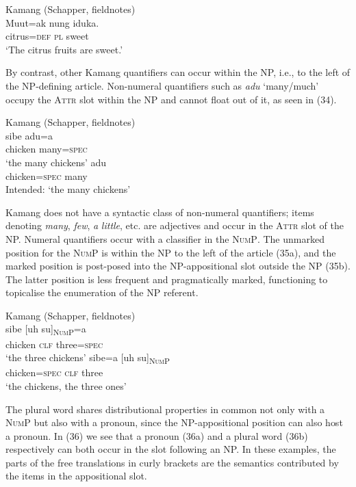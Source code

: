 \ea%
\label{ex:33}
Kamang (Schapper, fieldnotes)\\
\gll  Muut=ak nung iduka. \\
  citrus=\textsc{def} \textsc{pl} sweet   \\
\glt `The citrus fruits are sweet.'
\z






By contrast, other Kamang quantifiers can occur within the NP, i.e., to the left of the NP-defining article. Non-numeral quantifiers such as \textit{adu} `many/much' occupy the \textsc{Attr} slot within the NP and cannot float out of it, as seen in (34).


\ea%
Kamang (Schapper, fieldnotes)\\
\label{ex:34}
\ea
\gll sibe adu=a \\
  chicken many=\textsc{spec} \\
\glt `the many chickens'
\ex
{} {adu} \\
chicken=\textsc{spec} many \\
\glt Intended: `the many chickens'
\z
\z



Kamang does not have a syntactic class of non-numeral quantifiers; items denoting \textit{many}, \textit{few}, \textit{a} \textit{little}, etc. are adjectives and occur in the \textsc{Attr} slot of the NP. Numeral quantifiers occur with a classifier in the \textsc{NumP}. The unmarked position for the \textsc{NumP} is within the NP to the left of the article (35a), and the marked position is post-posed into the NP-appositional slot outside the NP (35b). The latter position is less frequent and pragmatically marked, functioning to topicalise the enumeration of the NP referent.


\ea%
\label{ex:35}
Kamang (Schapper, fieldnotes)\\
\ea
\gll  sibe [{uh}   {su}]\textsc{\textsubscript{NumP}}{=a}\\
  chicken \textsc{clf } three=\textsc{spec} \\
 \glt `the three chickens'
\ex
\gll sibe=a [uh su]\textsc{\textsubscript{NumP}} \\
 chicken=\textsc{spec} \textsc{clf} three  \\
\glt `the chickens, the three ones'
\z
\z


The plural word shares distributional properties in common not only with a \textsc{NumP} but also with a pronoun, since the NP-appositional position can also host a pronoun. In (36) we see that a pronoun (36a) and a plural word (36b) respectively can both occur in the slot following an NP. In these examples, the parts of the free translations in curly brackets are the semantics contributed by the items in the appositional slot.


